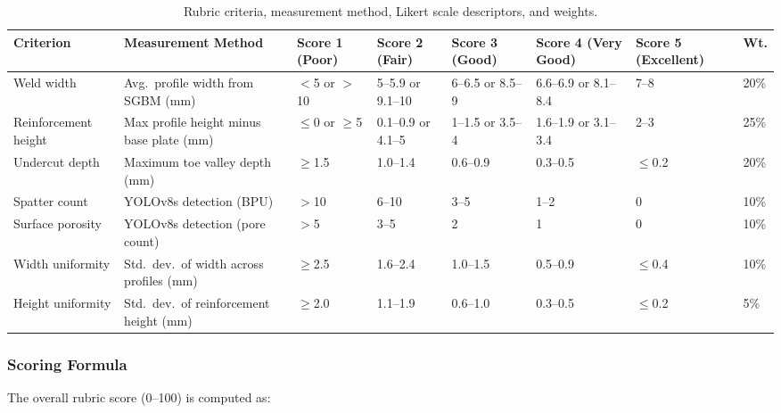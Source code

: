\documentclass[12pt,a4paper]{article}
\begin{document}
\begin{table}
  \centering
  \caption{Rubric criteria, measurement method, Likert scale descriptors, and weights.}
  \label{tab:rubric}
  \small
  \setlength{\tabcolsep}{4pt}
  \begin{tabular}{L{3.0cm} L{3.5cm} L{3.0cm} L{3.0cm} L{2.8cm} L{2.8cm} L{2.8cm} C{1.2cm}}
    \toprule
    \textbf{Criterion} &
    \textbf{Measurement Method} &
    \textbf{Score 1 (Poor)} &
    \textbf{Score 2 (Fair)} &
    \textbf{Score 3 (Good)} &
    \textbf{Score 4 (Very Good)} &
    \textbf{Score 5 (Excellent)} &
    \textbf{Wt.} \\
    \midrule
    Weld width &
    Avg.\ profile width from SGBM (mm) &
    $<$5 or $>$10 &
    5--5.9 or 9.1--10 &
    6--6.5 or 8.5--9 &
    6.6--6.9 or 8.1--8.4 &
    7--8 &
    20\% \\
    \addlinespace
    Reinforcement height &
    Max profile height minus base plate (mm) &
    $\le$0 or $\ge$5 &
    0.1--0.9 or 4.1--5 &
    1--1.5 or 3.5--4 &
    1.6--1.9 or 3.1--3.4 &
    2--3 &
    25\% \\
    \addlinespace
    Undercut depth &
    Maximum toe valley depth (mm) &
    $\ge$1.5 &
    1.0--1.4 &
    0.6--0.9 &
    0.3--0.5 &
    $\le$0.2 &
    20\% \\
    \addlinespace
    Spatter count &
    YOLOv8s detection (BPU) &
    $>$10 &
    6--10 &
    3--5 &
    1--2 &
    0 &
    10\% \\
    \addlinespace
    Surface porosity &
    YOLOv8s detection (pore count) &
    $>$5 &
    3--5 &
    2 &
    1 &
    0 &
    10\% \\
    \addlinespace
    Width uniformity &
    Std.\ dev.\ of width across profiles (mm) &
    $\ge$2.5 &
    1.6--2.4 &
    1.0--1.5 &
    0.5--0.9 &
    $\le$0.4 &
    10\% \\
    \addlinespace
    Height uniformity &
    Std.\ dev.\ of reinforcement height (mm) &
    $\ge$2.0 &
    1.1--1.9 &
    0.6--1.0 &
    0.3--0.5 &
    $\le$0.2 &
    5\% \\
    \bottomrule
  \end{tabular}
\end{table}

\subsubsection*{Scoring Formula}

The overall rubric score (0--100) is computed as:
\end{document}
